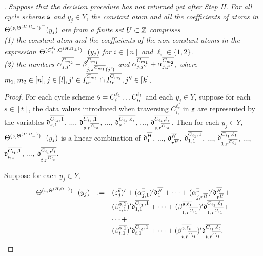 \begin{appendix}
\smallskip


.
{\it 
Suppose that the decision procedure has not returned yet after Step II. 
For all cycle scheme ${\mathfrak{s} }$ and $y_j \in Y$, the constant atom and all the coefficients of atoms in ${\Theta^{({\mathfrak{s} }, \Theta^{(H,\Omega_\bot)})}}^-(y_j)$ are from a finite set $U \subset {\mathbb{Z} }$ comprises\\ (1)
the constant atom and the coefficients of the non-constant atoms in the expression ${\Theta^{(C^{\ell_i}_{i}, \Theta^{(H,\Omega_\bot)})}}^-(y_j)$ for $i\in [n]$ and $\ell_i \in \{1,2\}$.\smallskip\\(2) the numbers $\alpha^{\overline{C_{m_2}}}_{j,j'} + \beta^{\overline{C_{m_1}}}_{j,\pi^{\overline{C_{m_1}}}(j')}$ and $\alpha^{\overline{C_{m_1}}}_{j, j''} + \alpha^{\overline{C_{m_2}}}_{j,j''}$, where  $m_1,m_2 \in [n], j\in[l],j' \in I^{\overline{C_{m_1}}}_{tr} \cap I^{\overline{C_{m_2}}}_{tr},  j'' \in [k]$. 
}

\begin{proof}
For each cycle scheme ${\mathfrak{s} }=C^{\ell_1}_{i_1} \dots C^{\ell_t}_{i_t}$ and each $y_j \in Y$, suppose for each $s\in [t]$, the data values introduced when traversing $C_{i_s}^{\ell_s}$ in ${\mathfrak{s} }$ are represented by the variables $\mathfrak{d}^{\overline{C_{i_s} , 1}}_{s,1}$, $\dots$, $\mathfrak{d}^{\overline{C_{i_s} , 1}}_{s,r^{\overline{C_{i_s}}}}$, $\dots$, $\mathfrak{d}^{\overline{C_{i_s} , \ell_s}}_{s,1}$, $\dots$, $\mathfrak{d}^{\overline{C_{i_s} , \ell_s}}_{s,r^{\overline{C_{i_s}}}}$. Then for each $y_j \in Y$,
 ${\Theta^{({\mathfrak{s} },\Theta^{(H,\Omega_\bot)})}}^-(y_j)$ is a linear combination of $\mathfrak{d}^{\overline{H}}_1$, $\dots$, $\mathfrak{d}^{\overline{H}}_{r^{\overline{H}}}$, $\mathfrak{d}^{\overline{C_{i_1} , 1}}_{1,1}$, $\dots$, $\mathfrak{d}^{\overline{C_{i_1} , \ell_1}}_{1,r^{\overline{C_{i_1}}}}$, $\dots$, $\mathfrak{d}^{\overline{C_{i_t} , 1}}_{t,1}$, $\dots$, $\mathfrak{d}^{\overline{C_{i_t} , \ell_t}}_{t, r^{\overline{C_{i_t}}}}$. 

Suppose for each $y_j \in Y$,
\[
\begin{array}{l cl }
{\Theta^{({\mathfrak{s} },\Theta^{(H,\Omega_\bot)})}}^-(y_j) &:= & (\varepsilon^{\overline{{\mathfrak{s} }}}_{j})'  + (\alpha^{\overline{{\mathfrak{s} }}}_{j,1})' \mathfrak{d}^{\overline{H}}_1 + \dots + (\alpha^{\overline{{\mathfrak{s} }}}_{j,r^{\overline{H}}})' \mathfrak{d}^{\overline{H}}_{r^{\overline{H}}} + \\
& & (\beta^{\overline{{\mathfrak{s} },1}}_{1,1})' \mathfrak{d}^{\overline{C_{i_1},1}}_{1,1}  + \dots + (\beta^{\overline{{\mathfrak{s} },\ell_1}}_{1,r^{\overline{C_{i_1}}}})' \mathfrak{d}^{\overline{C_{i_1},\ell_1}}_{1,r^{\overline{C_{i_1}}}}  +  \\
& & \dots + \\
& & (\beta^{\overline{{\mathfrak{s} },1}}_{t,1})' \mathfrak{d}^{\overline{C_{i_{t}},1}}_{t,1} + \dots + (\beta^{\overline{{\mathfrak{s} },\ell_{t}}}_{t,r^{\overline{C_{i_{t}}}}})' \mathfrak{d}^{\overline{C_{i_{t}},\ell_{t}}}_{t, r^{\overline{C_{i_{t}}}}}.
\end{array}
\]


\end{proof}
\end{appendix}
